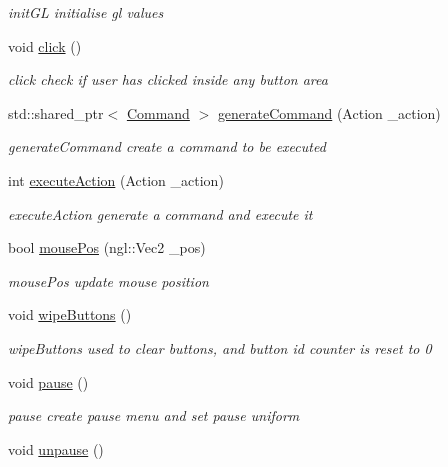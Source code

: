\begin{DoxyCompactItemize}
\begin{DoxyCompactList}\small\item\em init\+G\+L initialise gl values \end{DoxyCompactList}\item 
void \hyperlink{class_gui_af0f43b8a1cfb88675c9a7cea741306f1}{click} ()
\begin{DoxyCompactList}\small\item\em click check if user has clicked inside any button area \end{DoxyCompactList}\item 
std\+::shared\+\_\+ptr$<$ \hyperlink{class_command}{Command} $>$ \hyperlink{class_gui_a0b14b6b38305c133341b2e396d299056}{generate\+Command} (Action \+\_\+action)
\begin{DoxyCompactList}\small\item\em generate\+Command create a command to be executed \end{DoxyCompactList}\item 
int \hyperlink{class_gui_a6f41a2f17db655a640dca0a01f5b89d0}{execute\+Action} (Action \+\_\+action)
\begin{DoxyCompactList}\small\item\em execute\+Action generate a command and execute it \end{DoxyCompactList}\item 
bool \hyperlink{class_gui_a24e2191386f1b05259d9c029efd2d876}{mouse\+Pos} (ngl\+::\+Vec2 \+\_\+pos)
\begin{DoxyCompactList}\small\item\em mouse\+Pos update mouse position \end{DoxyCompactList}\item 
\hypertarget{class_gui_ac9a9c05daeecd9b9719599992afc4baa}{}void \hyperlink{class_gui_ac9a9c05daeecd9b9719599992afc4baa}{wipe\+Buttons} ()\label{class_gui_ac9a9c05daeecd9b9719599992afc4baa}

\begin{DoxyCompactList}\small\item\em wipe\+Buttons used to clear buttons, and button id counter is reset to 0 \end{DoxyCompactList}\item 
\hypertarget{class_gui_a925aaf59068dec101a1fd17c55e81645}{}void \hyperlink{class_gui_a925aaf59068dec101a1fd17c55e81645}{pause} ()\label{class_gui_a925aaf59068dec101a1fd17c55e81645}

\begin{DoxyCompactList}\small\item\em pause create pause menu and set pause uniform \end{DoxyCompactList}\item 
\hypertarget{class_gui_ad6def026b549e134edd59b8b31927d24}{}void \hyperlink{class_gui_ad6def026b549e134edd59b8b31927d24}{unpause} ()\label{class_gui_ad6def026b549e134edd59b8b31927d24}


\end{DoxyCompactItemize}
